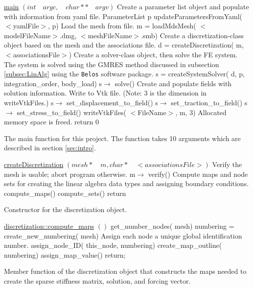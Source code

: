 \documentclass[a4paper, 12pt]{article}
\begin{document}
\vspace{\baselineskip}
\begin{algorithm} [H] 
  \underline{main} $(int \quad argc, \quad char** \quad argv)$ 
  \BlankLine
    \tcc
    {
      Create a parameter list object and populate with information
      from yaml file.
    }
    ParameterList p\;
    updateParametersFromYaml( $<$yamlFile$>$, p)\;
    \tcc
    { 
      Load the mesh from file.
    }
    m = loadMdsMesh( $<$modelFileName$>$.dmg, $<$meshFileName$>$.smb)\;
    \tcc
    { 
      Create a discretization-class object based on the mesh
      and the associations file.
    }
    d = createDiscretization( m, $<$associationsFile$>$)\;
    \tcc
    {
      Create a solver-class object, then solve the FE system.
      The system is solved using the GMRES method discussed
      in subsection \ref{subsec:LinAlg} using the
      \texttt{Belos} software package.
    }
    s = createSystemSolver( d, p, integration\_order, body\_load)\;
    s$\rightarrow$ solve()\;
    \tcc
    {
      Create and populate fields with solution information. 
      Write to Vtk file. (Note: 3 is the dimension in writeVtkFiles.)
    }
    s$\rightarrow$ set\_displacement\_to\_field()\;
    s$\rightarrow$ set\_traction\_to\_field()\;
    s$\rightarrow$ set\_stress\_to\_field()\;
    writeVtkFiles( $<$FileName$>$, m, 3)\;
    \tcc
    {
      Allocated memory space is freed.
    }
    return 0 \;
  \caption{The main function for this project. The function takes 10 
            arguments which are described in section \ref{sec:intro}.}
  \label{al:main}
\end{algorithm}

\vspace{\baselineskip}
\begin{algorithm}[H]
  \underline{createDiscretization} $(mesh* \quad m, char* \quad <associationsFile>)$
  \BlankLine
  \tcc
  {
    Verify the mesh is usable; abort program otherwise.
  }
  m$\rightarrow$ verify()\;
  \tcc
  {
    Compute maps and node sets for creating the linear algebra data types
    and assigning boundary conditions.
  }
  compute\_maps()\;
  compute\_sets()\;
  return\;
  \caption{Constructor for the discretization object.}
  \label{al:creatDisc}
\end{algorithm}

\vspace{\baselineskip}
\begin{algorithm}
  \underline{discretization::compute\_maps} $()$
  \BlankLine
  get\_number\_nodes( mesh)\;
  numbering = create\_new\_numbering( mesh)\;
  {
    \tcc
    {
      Assign each node a unique global identification number.
    }
    assign\_node\_ID( this\_node, numbering)\;
  }
  create\_map\_outline( numbering)\;
  {
    {
      assign\_map\_value()\;
    }
  }
  return;
  \caption{Member function of the discretization object that constructs
            the maps needed to create the sparse stiffness matrix, solution,
            and forcing vector.}
  \label{al:compMaps}
\end{algorithm}
\end{document}
